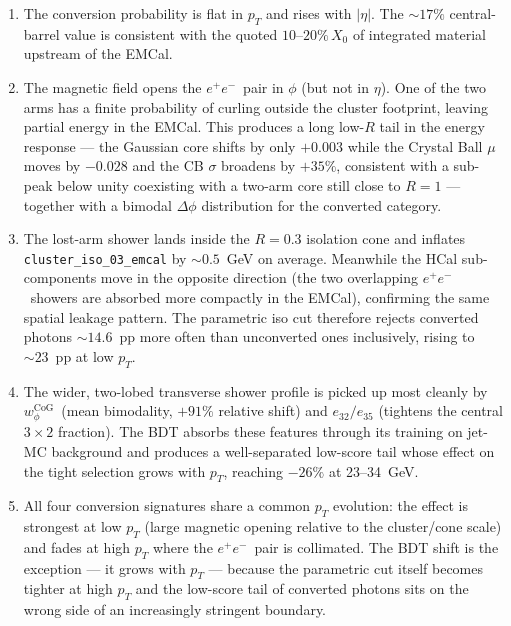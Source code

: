 \documentclass[11pt,a4paper]{article}
\newcommand{\wphicog}{\texorpdfstring{$w_{\phi}^{\mathrm{CoG}}$}{w\_phi\textasciicircum CoG}}
\newcommand{\epem}{\ensuremath{e^{+}e^{-}}}
\begin{document}
\begin{enumerate}
  \item The conversion probability is flat in \(p_T\) and rises with
  $|\eta|$. The $\sim 17\%$ central-barrel value is consistent with the
  quoted $10$--$20\%\,X_0$ of integrated material upstream of the EMCal.
  \item The magnetic field opens the \epem\ pair in $\phi$ (but not in
  $\eta$). One of the two arms has a finite probability of curling outside
  the cluster footprint, leaving partial energy in the EMCal. This produces
  a long low-$R$ tail in the energy response --- the Gaussian core shifts by
  only $+0.003$ while the Crystal Ball $\mu$ moves by $-0.028$ and the CB
  $\sigma$ broadens by $+35\%$, consistent with a sub-peak below unity
  coexisting with a two-arm core still close to $R=1$ --- together with a
  bimodal $\Delta\phi$ distribution for the converted category.
  \item The lost-arm shower lands inside the $R=0.3$ isolation cone and
  inflates \texttt{cluster\_iso\_03\_emcal} by $\sim 0.5$~GeV on average.
  Meanwhile the HCal sub-components move in the opposite direction (the
  two overlapping \epem\ showers are absorbed more compactly in the EMCal),
  confirming the same spatial leakage pattern. The parametric iso cut
  therefore rejects converted photons $\sim 14.6$~pp more often than
  unconverted ones inclusively, rising to $\sim 23$~pp at low \(p_T\).
  \item The wider, two-lobed transverse shower profile is picked up most
  cleanly by \wphicog\ (mean bimodality, $+91\%$ relative shift) and
  $e_{32}/e_{35}$ (tightens the central $3\times 2$ fraction). The BDT
  absorbs these features through its training on jet-MC background and
  produces a well-separated low-score tail whose effect on the tight
  selection grows with \(p_T\), reaching $-26\%$ at 23--34~GeV.
  \item All four conversion signatures share a common \(p_T\) evolution:
  the effect is strongest at low \(p_T\) (large magnetic opening relative to
  the cluster/cone scale) and fades at high \(p_T\) where the \epem\ pair is
  collimated. The BDT shift is the exception --- it grows with \(p_T\) ---
  because the parametric cut itself becomes tighter at high \(p_T\) and the
  low-score tail of converted photons sits on the wrong side of an
  increasingly stringent boundary.
\end{enumerate}
\end{document}
